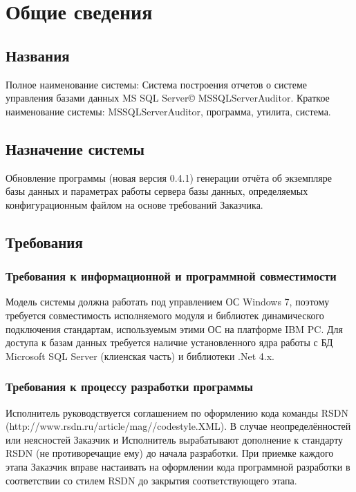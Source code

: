 \section{Общие сведения}

\subsection{Названия}

Полное наименование системы: Система построения отчетов о системе управления базами данных MS SQL
Server{\copyright} MSSQLServerAuditor. Краткое наименование системы: MSSQLServerAuditor, программа,
утилита, система.

\subsection{Назначение системы}

Обновление программы (новая версия 0.4.1) генерации отчёта об экземпляре базы данных и параметрах
работы сервера базы данных, определяемых конфигурационным файлом на основе требований Заказчика.

\subsection{Требования}

\subsubsection{Требования к информационной и программной совместимости}

Модель системы должна работать под управлением ОС Windows 7, поэтому требуется совместимость
исполняемого модуля и библиотек динамического подключения стандартам, используемым этими ОС на
платформе IBM PC. Для доступа к базам данных требуется наличие установленного ядра работы с БД
Microsoft SQL Server (клиенская часть) и библиотеки .Net 4.x.

\subsubsection{Требования к процессу разработки программы}

Исполнитель руководствуется соглашением по оформлению кода команды RSDN
(http://www.rsdn.ru/\-article\-/mag//\-codestyle.\-XML). В случае неопределённостей или
неясностей Заказчик и Исполнитель вырабатывают дополнение к стандарту RSDN (не противоречащие ему)
до начала разработки. При приемке каждого этапа Заказчик вправе настаивать на оформлении кода
программной разработки в соответствии со стилем RSDN до закрытия соответствующего этапа.

